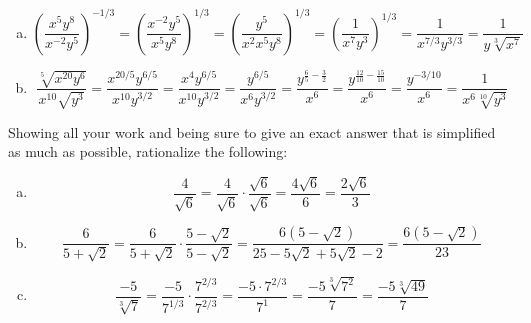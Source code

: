 \documentclass[12pt,letterpaper]{exam}
\begin{document}
\begin{questions}
\begin{enumerate}[(a)]
\item 
	\[
	\left( \dfrac{x^5 y^8}{x^{-2} y^5} \right)^{-1/3}= \left( \dfrac{x^{-2} y^5}{x^5 y^8} \right)^{1/3}= \left( \dfrac{y^5}{x^2 x^5 y^8} \right)^{1/3}= \left( \dfrac{1}{x^7 y^3} \right)^{1/3}= \dfrac{1}{x^{7/3} y^{3/3}}= \dfrac{1}{y \sqrt[3]{x^7}}
	\] \pspace

\item 
	\[
	\dfrac{\sqrt[5]{x^{20} y^6}}{x^{10} \sqrt{y^3}}= \dfrac{x^{20/5} y^{6/5}}{x^{10} y^{3/2}}= \dfrac{x^4 y^{6/5}}{x^{10} y^{3/2}}= \dfrac{y^{6/5}}{x^6 y^{3/2}}= \dfrac{y^{\frac{6}{5} - \frac{3}{2}}}{x^6}= \dfrac{y^{\frac{12}{10} - \frac{15}{10}}}{x^6}= \dfrac{y^{-3/10}}{x^6}= \dfrac{1}{x^6 \sqrt[10]{y^3}}
	\]
\end{enumerate}



\newpage
\question Showing all your work and being sure to give an exact answer that is simplified as much as possible, rationalize the following:
	 \pspace

\sol
\begin{enumerate}[(a)]
\item 
	\[
	\dfrac{4}{\sqrt{6}}= \dfrac{4}{\sqrt{6}} \cdot \dfrac{\sqrt{6}}{\sqrt{6}}= \dfrac{4 \sqrt{6}}{6}= \dfrac{2 \sqrt{6}}{3}
	\] \pspace

\item 
	\[
	\dfrac{6}{5 + \sqrt{2}}= \dfrac{6}{5 + \sqrt{2}} \cdot \dfrac{5 - \sqrt{2}}{5 - \sqrt{2}}= \dfrac{6(5 - \sqrt{2})}{25 - 5\sqrt{2} + 5\sqrt{2} - 2}= \dfrac{6(5 - \sqrt{2})}{23}
	\] \pspace

\item 
	\[
	\dfrac{-5}{\sqrt[3]{7}}= \dfrac{-5}{7^{1/3}} \cdot \dfrac{7^{2/3}}{7^{2/3}}= \dfrac{-5 \cdot 7^{2/3}}{7^1}= \dfrac{-5 \sqrt[3]{7^2}}{7}= \dfrac{-5 \sqrt[3]{49}}{7}
	\]
\end{enumerate}




\end{questions}
\end{document}
